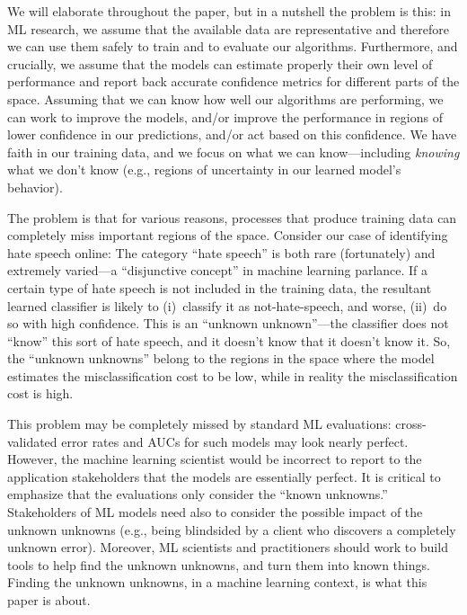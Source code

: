 We will elaborate throughout the paper, but in a nutshell the problem is this: in ML research, we assume that the available data are representative and therefore we can use them safely to train and to evaluate our algorithms. Furthermore, and crucially, we assume that the models can estimate properly their own level of performance and report back accurate confidence metrics for different parts of the space. Assuming that we can know how well our algorithms are performing, we can work to improve the models, and/or improve the performance in regions of lower confidence in our predictions, and/or act based on this confidence.  We have faith in our training data, and we focus on what we can know---including \emph{knowing} what we don't know (e.g., regions of uncertainty in our learned model's behavior).

The problem is that for various reasons, processes that produce training data can completely miss important regions of the space.  Consider our case of identifying hate speech online: The category ``hate speech'' is both rare (fortunately) and extremely varied---a ``disjunctive concept'' in machine learning parlance.  If a certain type of hate speech is not included in the training data, the resultant learned classifier is likely to (i)~classify it as not-hate-speech, and worse, (ii)~do so with high confidence.  This is an ``unknown unknown''---the classifier does not ``know'' this sort of hate speech, and it doesn't know that it doesn't know it. So, the ``unknown unknowns'' belong to the regions in the space where the model estimates the misclassification cost to be low, while in reality the misclassification cost is high.

This problem may be completely missed by standard ML evaluations: cross-validated error rates and AUCs for such models may look nearly perfect.  However, the machine learning scientist would be incorrect to report to the application stakeholders that the models are essentially perfect.  It is critical to emphasize that the evaluations only consider the ``known unknowns.''  Stakeholders of ML models need also to consider the possible impact of the unknown unknowns (e.g., being blindsided by a client who discovers a completely unknown error).  Moreover, ML scientists and practitioners should work to build tools to help find the unknown unknowns, and turn them into known things.  Finding the unknown unknowns, in a machine learning context, is what this paper is about.

